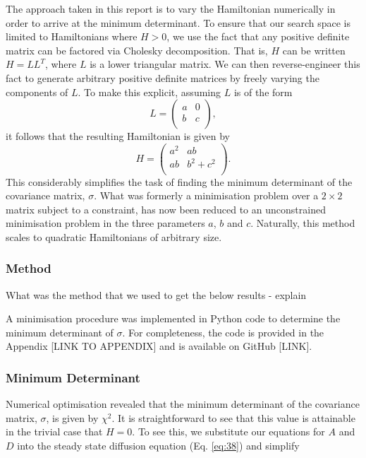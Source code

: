 \documentclass[11pt,a4paper]{article}
\numberwithin{equation}{section}
\begin{document}
	The approach taken in this report is to vary the Hamiltonian numerically in order to arrive at the minimum determinant. To ensure that our search space is limited to Hamiltonians where $H>0$, we use the fact that any positive definite matrix can be factored via Cholesky decomposition. That is, $H$ can be written	$H = LL^T$,	where $L$ is a lower triangular matrix. We can then reverse-engineer this fact to generate arbitrary positive definite matrices by freely varying the components of $L$. To make this explicit, assuming $L$ is of the form \begin{equation}\label{eq:39}
	L = \begin{pmatrix}
	a & 0  \\
	b & c\\
	\end{pmatrix},
	\end{equation}
	it follows that the resulting Hamiltonian is given by
	\begin{equation} \label{eq:41}
	H = \begin{pmatrix}
	a^{2} & ab  \\
	ab & b^{2}+c^{2}\\
	\end{pmatrix}.
	\end{equation}
	This considerably simplifies the task of finding the minimum determinant of the covariance matrix, $\sigma$. What was formerly a minimisation problem over a $2\times2$ matrix subject to a constraint, has now been reduced to an unconstrained minimisation problem in the three parameters $a$, $b$ and $c$. Naturally, this method scales to quadratic Hamiltonians of arbitrary size.
	
	\color{red}\subsubsection{Method}\color{black}
	What was the method that we used to get the below results - explain
	
	A minimisation procedure was implemented in Python code to determine the minimum determinant of $\sigma$. For completeness, the code is provided in the Appendix [LINK TO APPENDIX] and is available on GitHub [LINK].
	
	\subsubsection{Minimum Determinant}
	
	Numerical optimisation revealed that the minimum determinant of the covariance matrix, $\sigma$, is given by $\chi^{2}$. It is straightforward to see that this value is attainable in the trivial case that $H=0$. To see this, we substitute our equations for $A$ and $D$ into the steady state diffusion equation (Eq. \ref{eq:38}) and simplify
	
\end{document}
